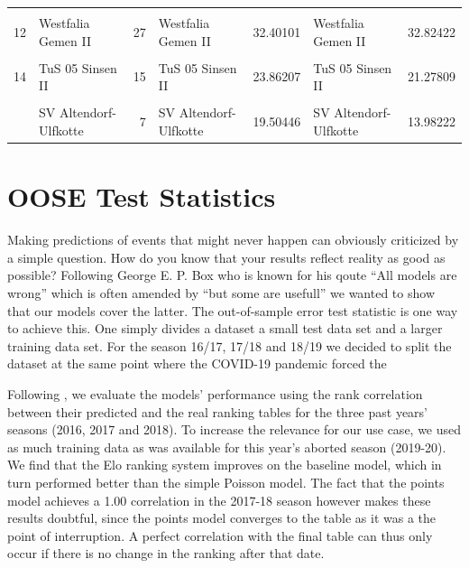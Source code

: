 \documentclass[12pt,a4paper]{article}
\begin{document}
\begin{table}[H]
{\begin{tabular}[t]{rlrlrlr}
\addlinespace
\cellcolor{gray!6}{11} & \cellcolor{gray!6}{FC RW Dorsten} & \cellcolor{gray!6}{28} & \cellcolor{gray!6}{FC RW Dorsten} & \cellcolor{gray!6}{35.82449} & \cellcolor{gray!6}{FC RW Dorsten} & \cellcolor{gray!6}{37.59242}\\
12 & Westfalia Gemen II & 27 & Westfalia Gemen II & 32.40101 & Westfalia Gemen II & 32.82422\\
\cellcolor{gray!6}{13} & \cellcolor{gray!6}{SC Reken II} & \cellcolor{gray!6}{25} & \cellcolor{gray!6}{SC Reken II} & \cellcolor{gray!6}{29.11275} & \cellcolor{gray!6}{SC Reken II} & \cellcolor{gray!6}{27.60483}\\
14 & TuS 05 Sinsen II & 15 & TuS 05 Sinsen II & 23.86207 & TuS 05 Sinsen II & 21.27809\\
\cellcolor{gray!6}{15} & \cellcolor{gray!6}{Adler Weseke II} & \cellcolor{gray!6}{15} & \cellcolor{gray!6}{Adler Weseke II} & \cellcolor{gray!6}{22.59512} & \cellcolor{gray!6}{Adler Weseke II} & \cellcolor{gray!6}{18.88125}\\
\addlinespace
16 & SV Altendorf-Ulfkotte & 7 & SV Altendorf-Ulfkotte & 19.50446 & SV Altendorf-Ulfkotte & 13.98222\\
\bottomrule
\end{tabular}}
\end{table}

\hypertarget{oose-test-statistics}{%
\section{OOSE Test Statistics}\label{oose-test-statistics}}

Making predictions of events that might never happen can obviously
criticized by a simple question. How do you know that your results
reflect reality as good as possible? Following George E. P. Box who is
known for his qoute \enquote{All models are wrong} which is often
amended by \enquote{but some are usefull} we wanted to show that our
models cover the latter. The out-of-sample error test statistic is one
way to achieve this. One simply divides a dataset a small test data set
and a larger training data set. For the season 16/17, 17/18 and 18/19 we
decided to split the dataset at the same point where the COVID-19
pandemic forced the

Following \textcite{leitner2010}, we evaluate the models' performance
using the rank correlation between their predicted and the real ranking
tables for the three past years' seasons (2016, 2017 and 2018). To
increase the relevance for our use case, we used as much training data
as was available for this year's aborted season (2019-20). We find that
the Elo ranking system improves on the baseline model, which in turn
performed better than the simple Poisson model. The fact that the points
model achieves a 1.00 correlation in the 2017-18 season however makes
these results doubtful, since the points model converges to the table as
it was a the point of interruption. A perfect correlation with the final
table can thus only occur if there is no change in the ranking after
that date.
\end{document}
